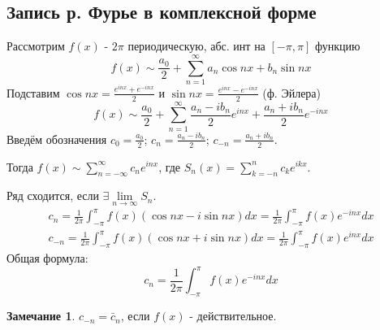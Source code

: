 \documentclass{article}
\theoremstyle{definition}
\numberwithin{theorem}{section}
\numberwithin{lemma}{section}
\numberwithin{definition}{section}
\numberwithin{corollary}{section}
\newtheorem*{remark}{Замечание}
\numberwithin{equation}{section}
\begin{document}
\subsection{Запись р. Фурье в комплексной форме}
Рассмотрим $f(x)$ - $2\pi$ периодическую, абс. инт на $[-\pi,\pi]$ функцию
\[
  f(x) \sim \frac{a_0}{2}+\sum_{n=1}^{\infty}a_n\cos nx + b_n\sin nx
\]
Подставим $\cos nx =\frac{e^{inx}+e^{-inx}}{2}$ и $\sin nx = \frac{e^{inx}-e^{-inx}}{2}$ (ф. Эйлера)
\[
  f(x)\sim \frac{a_0}{2}+\sum_{n=1}^{\infty}\frac{a_n-ib_n}{2}e^{inx}+\frac{a_n+ib_n}{2}e^{-inx}
\]
Введём обозначения $c_0=\frac{a_{0}}{2}$; $c_n=\frac{a_n-ib_n}{2}$; $c_{-n}=\frac{a_n+ib_n}{2}$.

Тогда $f(x)\sim \sum_{n=-\infty}^{\infty}c_ne^{inx}$, где $S_n(x)=\sum_{k=-n}^{n}c_ke^{ikx}$.

Ряд сходится, если $\exists\lim \limits_{n\to\infty}S_n$.
\begin{gather*}
  c_n = \frac{1}{2\pi}\int_{-\pi}^{\pi}f(x)(\cos nx - i \sin nx)dx 
  = \frac{1}{2\pi}\int_{-\pi}^{\pi}f(x)e^{-inx}dx \\ 
  c_{-n}=\frac{1}{2\pi} \int_{-\pi}^{\pi}f(x)(\cos nx + i\sin nx)dx 
  = \frac{1}{2\pi}\int_{-\pi}^{\pi}f(x)e^{inx}dx
\end{gather*}
Общая формула:
\[
  c_n=\frac{1}{2\pi}\int_{-\pi}^{\pi}f(x)e^{-inx}dx
\]
\begin{remark}
  $c_{-n}=\bar{c}_n$, если $f(x)$ - действительное.
\end{remark}
\end{document}
